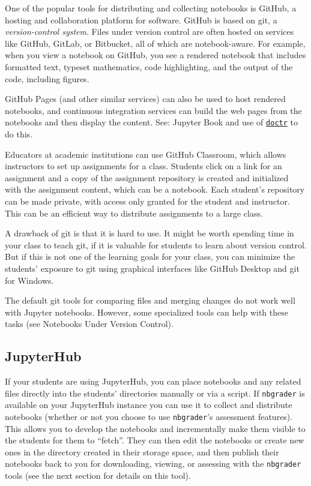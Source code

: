 \documentclass[]{book}
\begin{document}
One of the popular tools for distributing and collecting notebooks is
GitHub, a hosting and collaboration platform for software. GitHub is
based on git, a \emph{version-control system}. Files under version
control are often hosted on services like GitHub, GitLab, or Bitbucket,
all of which are notebook-aware. For example, when you view a notebook
on GitHub, you see a rendered notebook that includes formatted text,
typeset mathematics, code highlighting, and the output of the code,
including figures.

GitHub Pages (and other similar services) can also be used to host
rendered notebooks, and continuous integration services can build the
web pages from the notebooks and then display the content. See: Jupyter
Book and use of \href{https://drdoctr.github.io/doctr}{\texttt{doctr}}
to do this.

Educators at academic institutions can use GitHub Classroom, which
allows instructors to set up assignments for a class. Students click on
a link for an assignment and a copy of the assignment repository is
created and initialized with the assignment content, which can be a
notebook. Each student's repository can be made private, with access
only granted for the student and instructor. This can be an efficient
way to distribute assignments to a large class.

A drawback of git is that it is hard to use. It might be worth spending
time in your class to teach git, if it is valuable for students to learn
about version control. But if this is not one of the learning goals for
your class, you can minimize the students' exposure to git using
graphical interfaces like GitHub Desktop and git for Windows.

The default git tools for comparing files and merging changes do not
work well with Jupyter notebooks. However, some specialized tools can
help with these tasks (see Notebooks Under Version Control).

\subsection{JupyterHub}\label{jupyterhub}

If your students are using JupyterHub, you can place notebooks and any
related files directly into the students' directories manually or via a
script. If \texttt{nbgrader} is available on your JupyterHub instance
you can use it to collect and distribute notebooks (whether or not you
choose to use \texttt{nbgrader}'s assessment features). This allows you
to develop the notebooks and incrementally make them visible to the
students for them to ``fetch''. They can then edit the notebooks or
create new ones in the directory created in their storage space, and
then publish their notebooks back to you for downloading, viewing, or
assessing with the \texttt{nbgrader} tools (see the next section for
details on this tool).
\end{document}

